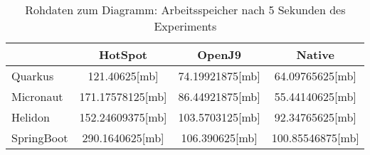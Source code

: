 \begin{table}[h]
    \centering
    \begin{tabular}{l|ccc}
        \hline
        & HotSpot & OpenJ9 & Native \\
        \hline
        Quarkus & 121.40625[mb] & 74.19921875[mb] & 64.09765625[mb] \\
        Micronaut & 171.17578125[mb] & 86.44921875[mb] & 55.44140625[mb] \\
        Helidon & 152.24609375[mb] & 103.5703125[mb] & 92.34765625[mb] \\
        SpringBoot & 290.1640625[mb] & 106.390625[mb] & 100.85546875[mb] \\
        \hline
    \end{tabular}
    \caption{Rohdaten zum Diagramm: Arbeitsspeicher nach 5 Sekunden des Experiments}
\end{table}
